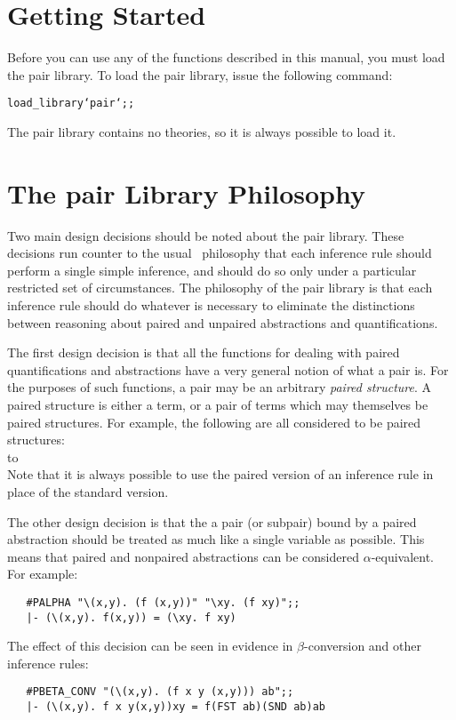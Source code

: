\section{Getting Started}

Before you can use any of the functions described in this manual,
you must load the pair library.
To load the pair library, issue the following command:
\begin{hol}\begin{alltt}
    load_library `pair`;;
\end{alltt}\end{hol}
The pair library contains no theories, so it is always possible to load it.

\section{The pair Library Philosophy}

Two main design decisions should be noted about the pair library.
These decisions run counter to the usual \HOL\ philosophy that each
inference rule should perform a single simple inference,
and should do so only under a particular restricted set of circumstances.
The philosophy of the pair library is that each 
inference rule should do whatever is necessary to eliminate the distinctions
between reasoning about paired and unpaired abstractions and quantifications.

The first design decision is that all the functions for dealing with paired
quantifications and abstractions have a very general notion of what a pair is.
For the purposes of such functions, a pair may be an arbitrary
{\it paired structure}.
A paired structure is either a term,
or a pair of terms which may themselves be paired structures.
For example, the following are all considered to be paired structures:	\\
\noindent
\hbox to \textwidth{\tt
	\hfil
	a
	\hfil
	(a,b)
	\hfil
	(a,b,c)
	\hfil
	((a1,a2),(b1,b2))
	\hfil
	((a1,a2),(b2,b2),(c1,c2))
	\hfil
}\\
\noindent
Note that it is always possible to use the paired version
of an inference rule in place of the standard version.

The other design decision is that the a pair (or subpair) bound by a paired
abstraction should be treated as much like a single variable as possible.
This means that paired and nonpaired abstractions can be considered
$\alpha$-equivalent.
For example:
\begin{boxed}\begin{verbatim}
   #PALPHA "\(x,y). (f (x,y))" "\xy. (f xy)";;
   |- (\(x,y). f(x,y)) = (\xy. f xy)
\end{verbatim}\end{boxed}
The effect of this decision can be seen in evidence in $\beta$-conversion
and other inference rules:
\begin{boxed}\begin{verbatim}
   #PBETA_CONV "(\(x,y). (f x y (x,y))) ab";;
   |- (\(x,y). f x y(x,y))xy = f(FST ab)(SND ab)ab
\end{verbatim}\end{boxed}

